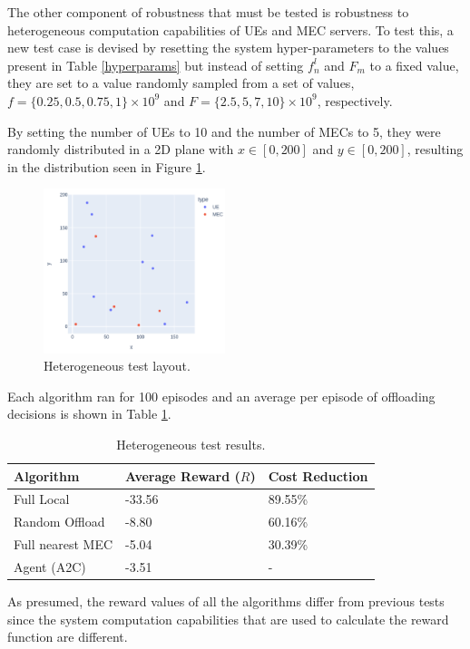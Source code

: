 \documentclass[conference]{IEEEtran}
\begin{document}
The other component of robustness that must be tested is robustness to heterogeneous computation capabilities of \acrshort{UE}s and \acrshort{MEC} servers. To test this, a new test case is devised by resetting the system hyper-parameters to the values present in Table \ref{hyperparams} but instead of setting $f^l_n$ and $F_m$ to a fixed value, they are set to a value randomly sampled from a set of values, $f = \{0.25, 0.5, 0.75, 1\} \times 10^9$ and $F = \{2.5, 5, 7, 10\} \times 10^9$, respectively.

By setting the number of \acrshort{UE}s to 10 and the number of \acrshort{MEC}s to 5, they were randomly distributed in a 2D plane with $x \in [0, 200]$ and $y \in [0, 200]$, resulting in the distribution seen in Figure \ref{hetero_test}.

\begin{figure}[H]
  \centering
  \includegraphics[width=200px]{images/5_10_layout.png}
  \caption{Heterogeneous test layout.}  \label{hetero_test}
\end{figure}

Each algorithm ran for 100 episodes and an average per episode of offloading decisions is shown in Table \ref{hetero_table}.

\begin{table}[H]
\centering
\begin{tabular}{|l|l|l|}
\hline
Algorithm        & Average Reward ($R$) & Cost Reduction\\ \hline
Full Local       & -33.56 & 89.55\%\\
Random Offload   & -8.80 & 60.16\%\\
Full nearest MEC & -5.04 & 30.39\%\\ 
Agent (A2C) & -3.51 & -\\ \hline
\end{tabular}
\caption{Heterogeneous test results.} \label{hetero_table}
\end{table}

As presumed, the reward values of all the algorithms differ from previous tests since the system computation capabilities that are used to calculate the reward function are different.
\end{document}
